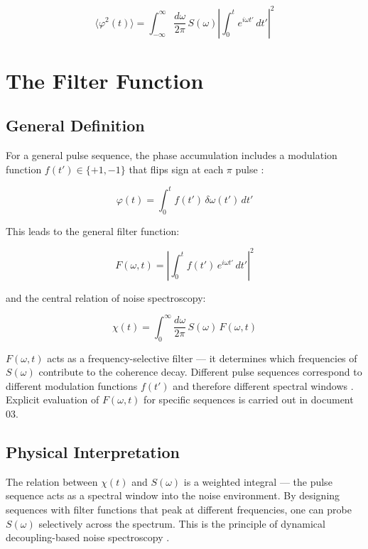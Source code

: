 \documentclass[12pt]{article}
\begin{document}
\begin{equation}
    \langle \varphi^2(t) \rangle = \int_{-\infty}^{\infty} \frac{d\omega}{2\pi}\, S(\omega) \left|\int_0^t e^{i\omega t'}\, dt'\right|^2
\end{equation}

\section{The Filter Function}

\subsection{General Definition}

For a general pulse sequence, the phase accumulation includes a modulation function $f(t') \in \{+1, -1\}$ that flips sign at each $\pi$ pulse \cite{Cywinski2008}:

\begin{equation}
    \varphi(t) = \int_0^t f(t')\, \delta\omega(t')\, dt'
\end{equation}

This leads to the general filter function:

\begin{equation}
    F(\omega, t) = \left|\int_0^t f(t')\, e^{i\omega t'}\, dt'\right|^2
\end{equation}

and the central relation of noise spectroscopy:

\begin{equation}
    \boxed{\chi(t) = \int_0^{\infty} \frac{d\omega}{2\pi}\, S(\omega)\, F(\omega, t)}
\end{equation}

$F(\omega, t)$ acts as a frequency-selective filter — it determines which frequencies of $S(\omega)$ contribute to the coherence decay. Different pulse sequences correspond to different modulation functions $f(t')$ and therefore different spectral windows \cite{Alvarez2011}. Explicit evaluation of $F(\omega, t)$ for specific sequences is carried out in document 03.

\subsection{Physical Interpretation}

The relation between $\chi(t)$ and $S(\omega)$ is a weighted integral — the pulse sequence acts as a spectral window into the noise environment. By designing sequences with filter functions that peak at different frequencies, one can probe $S(\omega)$ selectively across the spectrum. This is the principle of dynamical decoupling-based noise spectroscopy \cite{Bylander2011}.
\end{document}

